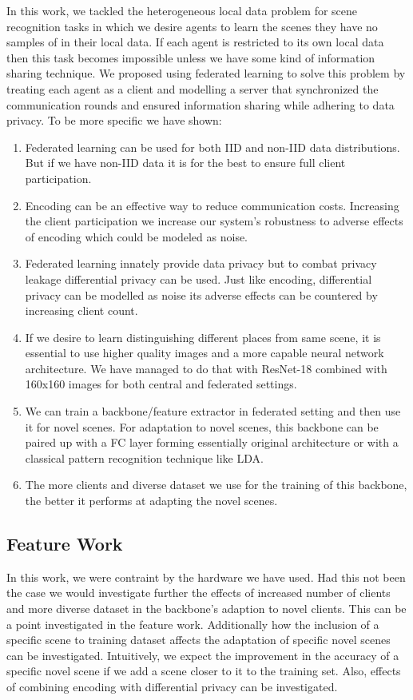 \documentclass[11pt]{article}
\begin{document}
\par In this work, we tackled the heterogeneous local data problem for scene recognition tasks in which we desire agents to learn the scenes they have no samples of in their local data. If each agent is restricted to its own local data then this task becomes impossible unless we have some kind of information sharing technique. We proposed using federated learning to solve this problem by treating each agent as a client and modelling a server that synchronized the communication rounds and ensured information sharing while adhering to data privacy. To be more specific we have shown:
\begin{enumerate}
  \item Federated learning can be used for both IID and non-IID data distributions. But if we have non-IID data it is for the best to ensure full client participation.
  \item Encoding can be an effective way to reduce communication costs. Increasing the client participation we increase our system's robustness to adverse effects of encoding which could be modeled as noise.
  \item Federated learning innately provide data privacy but to combat privacy leakage differential privacy can be used. Just like encoding, differential privacy can be modelled as noise its adverse effects can be countered by increasing client count.
  \item If we desire to learn distinguishing different places from same scene, it is essential to use higher quality images and a more capable neural network architecture. We have managed to do that with ResNet-18 combined with 160x160 images for both central and federated settings.
  \item We can train a backbone/feature extractor in federated setting and then use it for novel scenes. For adaptation to novel scenes, this backbone can be paired up with a FC layer forming essentially original architecture or with a classical pattern recognition technique like LDA. 
  \item The more clients and diverse dataset we use for the training of this backbone, the better it performs at adapting the novel scenes.
\end{enumerate}

\subsection{Feature Work}

\par In this work, we were contraint by the hardware we have used. Had this not been the case we would investigate further the effects of increased number of clients and more diverse dataset in the backbone's adaption to novel clients. This can be a point investigated in the feature work. Additionally how the inclusion of a specific scene to training dataset affects the adaptation of specific novel scenes can be investigated. Intuitively, we expect the improvement in the accuracy of a specific novel scene if we add a scene closer to it to the training set. Also, effects of combining encoding with differential privacy can be investigated.
\end{document}
